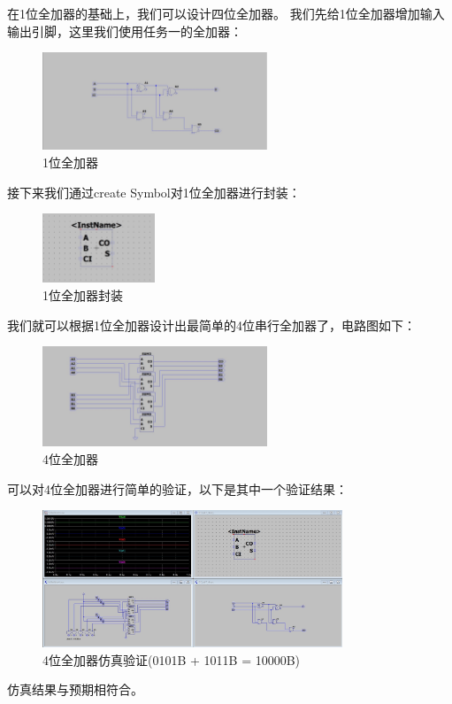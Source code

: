 \documentclass[UTF8]{ctexart}
\begin{document}
在1位全加器的基础上，我们可以设计四位全加器。
我们先给1位全加器增加输入输出引脚，这里我们使用任务一的全加器：

\begin{figure}[H]
    \centering
    \includegraphics[width = 0.6\textwidth]{1位全加器.jpg}
    \caption{1位全加器}
\end{figure}

接下来我们通过create Symbol对1位全加器进行封装：

\begin{figure}[H]
    \centering
    \includegraphics[width = 0.3\textwidth]{1位全加器封装.jpg}
    \caption{1位全加器封装}
\end{figure}

我们就可以根据1位全加器设计出最简单的4位串行全加器了，电路图如下：

\begin{figure}[H]
    \centering
    \includegraphics[width = 0.6\textwidth]{4位串行进位全加器.jpg}
    \caption{4位全加器}
\end{figure}

可以对4位全加器进行简单的验证，以下是其中一个验证结果：

\begin{figure}[H]
    \centering
    \includegraphics[width = 0.8\textwidth]{4位串行加法器仿真.jpg}
    \caption{4位全加器仿真验证(0101B + 1011B = 10000B)}
\end{figure}

仿真结果与预期相符合。
\end{document}
